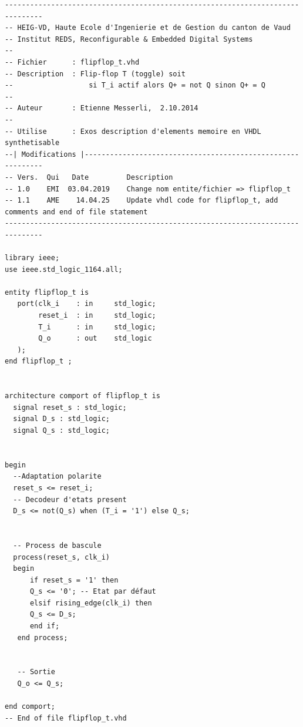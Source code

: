 \begin{verbatim}
-------------------------------------------------------------------------------
-- HEIG-VD, Haute Ecole d'Ingenierie et de Gestion du canton de Vaud
-- Institut REDS, Reconfigurable & Embedded Digital Systems
--
-- Fichier      : flipflop_t.vhd
-- Description  : Flip-flop T (toggle) soit 
--                  si T_i actif alors Q+ = not Q sinon Q+ = Q
-- 
-- Auteur       : Etienne Messerli,  2.10.2014
-- 
-- Utilise      : Exos description d'elements memoire en VHDL synthetisable
--| Modifications |------------------------------------------------------------
-- Vers.  Qui   Date         Description
-- 1.0    EMI  03.04.2019    Change nom entite/fichier => flipflop_t
-- 1.1    AME    14.04.25    Update vhdl code for flipflop_t, add comments and end of file statement
-------------------------------------------------------------------------------

library ieee;
use ieee.std_logic_1164.all;

entity flipflop_t is
   port(clk_i    : in     std_logic;
        reset_i  : in     std_logic;
        T_i      : in     std_logic;
        Q_o      : out    std_logic
   );
end flipflop_t ;


architecture comport of flipflop_t is
  signal reset_s : std_logic;
  signal D_s : std_logic;
  signal Q_s : std_logic;
  

begin
  --Adaptation polarite
  reset_s <= reset_i;
  -- Decodeur d'etats present
  D_s <= not(Q_s) when (T_i = '1') else Q_s;
  

  -- Process de bascule
  process(reset_s, clk_i)
  begin
      if reset_s = '1' then
      Q_s <= '0'; -- Etat par défaut
      elsif rising_edge(clk_i) then
      Q_s <= D_s;
      end if;
   end process;
  
  
   -- Sortie
   Q_o <= Q_s;

end comport;
-- End of file flipflop_t.vhd
\end{verbatim}
\newpage
